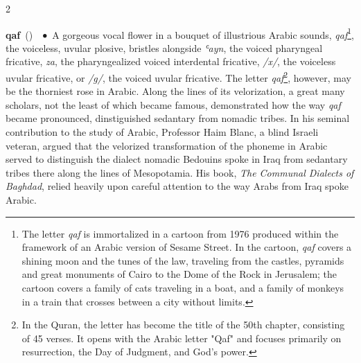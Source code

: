 \documentclass[10pt,a4paper,twoside]{article} %
\newcommand{\entry}[4]{\markboth{#1}{#1}\textbf{#1}\ {(#2)}\ \textit{#3}\ $\bullet$\ {#4}}  %
\begin{document}
\begin{multicols}{2}

\entry{qaf} {} {} {A gorgeous vocal flower in a bouquet of illustrious Arabic sounds, \emph{qaf}\footnote{The letter \emph{qaf} is immortalized in a cartoon from 1976 produced within the framework of an Arabic version of Sesame Street. In the cartoon, \emph{qaf} covers a shining moon and the tunes of the law, traveling from the castles, pyramids and great monuments of Cairo to the Dome of the Rock in Jerusalem; the cartoon covers a family of cats traveling in a boat, and a family of monkeys in a train that crosses between a city without limits.}, the voiceless, uvular plosive, bristles alongside \emph{ʿayn}, the voiced pharyngeal fricative, \emph{za}, the pharyngealized voiced interdental fricative, \emph{/x/}, the voiceless uvular fricative, or \emph{/g/}, the voiced uvular fricative. \newline \indent The letter \emph{qaf}\footnote{In the Quran, the letter has become the title of the 50th chapter, consisting of 45 verses.  It opens with the Arabic letter "Qaf" and focuses primarily on resurrection, the Day of Judgment, and God's power.}, however, may be the thorniest rose in Arabic. Along the lines of its velorization, a great many scholars, not the least of which became famous, demonstrated how the way  \emph{qaf} became pronounced, dinstiguished sedantary from nomadic tribes. In his seminal contribution to the study of Arabic, Professor Haim Blanc, a blind Israeli veteran, argued that the velorized transformation of the phoneme in Arabic served to distinguish the dialect nomadic Bedouins spoke in Iraq from sedantary tribes there along the lines of Mesopotamia. His book, \emph{The Communal Dialects of Baghdad}, relied heavily upon careful attention to the way Arabs from Iraq spoke Arabic.} 


\end{multicols}
\end{document}
